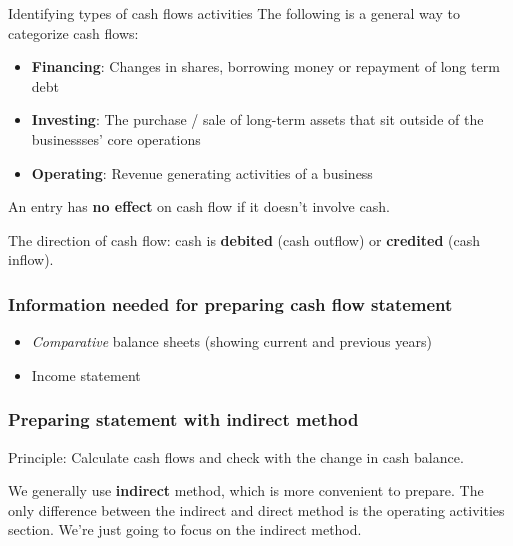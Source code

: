 \begin{theorem}
    {Identifying types of cash flows activities}
    The following is a general way to categorize cash flows:
    \begin{itemize}
        \item \textbf{Financing}: Changes in shares, borrowing money or repayment of long term debt
        \item \textbf{Investing}: The purchase / sale of long-term assets that sit outside of the businessses' core operations
        \item \textbf{Operating}: Revenue generating activities of a business
    \end{itemize}
    An entry has \textbf{no effect} on cash flow if it doesn't involve cash.

    The direction of cash flow: cash is \textbf{debited} (cash outflow) or \textbf{credited} (cash inflow).
\end{theorem}

\subsubsection{Information needed for preparing cash flow statement}
\begin{itemize}
    \item \textit{Comparative} balance sheets (showing current and previous years)
    \item Income statement
\end{itemize}

\subsubsection{Preparing statement with indirect method}

Principle: Calculate cash flows and check with the change in cash balance.

We generally use \textbf{indirect} method, which is more convenient to prepare. The only difference between the indirect and direct method is the operating activities section. We're just going to focus on the indirect method.

